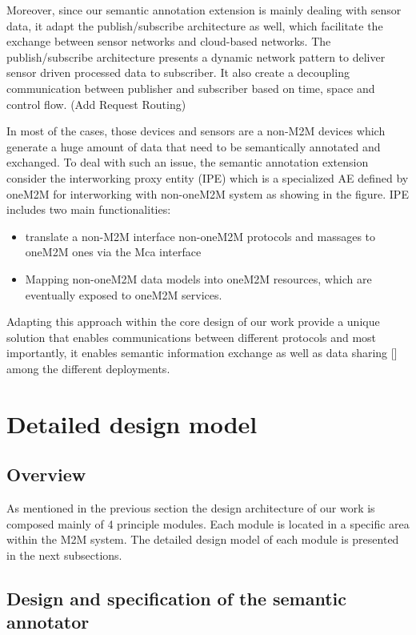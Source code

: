 Moreover, since our semantic annotation extension is mainly dealing with sensor data, it adapt the publish/subscribe architecture as well, which facilitate the exchange between sensor networks and cloud-based networks. The publish/subscribe architecture presents a dynamic network pattern to deliver sensor driven processed data to subscriber. It also create a decoupling communication between publisher and subscriber based on time, space and control flow. (Add Request Routing)\par
In most of the cases, those devices and sensors are a non-M2M devices which generate a huge amount of data that need to be semantically annotated and exchanged. To deal with such an issue, the semantic annotation extension consider the interworking proxy entity (IPE) which is a specialized AE defined by oneM2M for interworking with non-oneM2M system as showing in the figure. IPE includes two main functionalities:  
\begin{itemize}
\item translate a non-M2M interface non-oneM2M protocols and massages to oneM2M ones via the Mca interface
\item Mapping non-oneM2M data models into oneM2M resources, which are eventually exposed to oneM2M services.
\end{itemize}\par
Adapting this approach within the core design of our work provide a unique solution that enables communications between different protocols and most importantly, it enables semantic information exchange as well as data sharing [] among the different deployments.


\section{Detailed design model}

\subsection{Overview}
As mentioned in the previous section the design architecture of our work is composed mainly of 4 principle modules. Each module is located in a specific area within the M2M system. The detailed design model of each module is presented in the next subsections.





\subsection{Design and specification of the semantic annotator}

